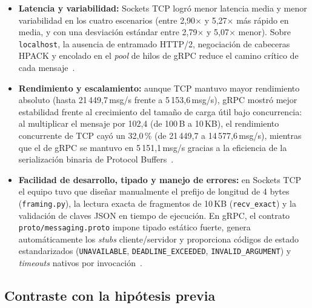 \begin{itemize}
  \item \textbf{Latencia y variabilidad:} Sockets TCP logró menor latencia media y menor variabilidad en los cuatro escenarios (entre 2,90$\times$ y 5,27$\times$ más rápido en media, y con una desviación estándar entre 2,79$\times$ y 5,07$\times$ menor). Sobre \texttt{localhost}, la ausencia de entramado HTTP/2, negociación de cabeceras HPACK y encolado en el \emph{pool} de hilos de gRPC reduce el camino crítico de cada mensaje~\cite{liu2022session,ciftci2025review}.
  \item \textbf{Rendimiento y escalamiento:} aunque TCP mantuvo mayor rendimiento absoluto (hasta 21\,449,7\,msg/s frente a 5\,153,6\,msg/s), gRPC mostró mejor estabilidad frente al crecimiento del tamaño de carga útil bajo concurrencia: al multiplicar el mensaje por 102,4 (de 100\,B a 10\,KB), el rendimiento concurrente de TCP cayó un 32,0\,\% (de 21\,449,7 a 14\,577,6\,msg/s), mientras que el de gRPC se mantuvo en 5\,151,1\,msg/s gracias a la eficiencia de la serialización binaria de Protocol Buffers~\cite{jackson2024streaming,mehdi2026crosslanguage}.
  \item \textbf{Facilidad de desarrollo, tipado y manejo de errores:} en Sockets TCP el equipo tuvo que diseñar manualmente el prefijo de longitud de 4 bytes (\texttt{framing.py}), la lectura exacta de fragmentos de 10\,KB (\texttt{recv\_exact}) y la validación de claves JSON en tiempo de ejecución. En gRPC, el contrato \texttt{proto/messaging.proto} impone tipado estático fuerte, genera automáticamente los \emph{stubs} cliente/servidor y proporciona códigos de estado estandarizados (\texttt{UNAVAILABLE}, \texttt{DEADLINE\_EXCEEDED}, \texttt{INVALID\_ARGUMENT}) y \emph{timeouts} nativos por invocación~\cite{niswar2024performance,zhu2025rethinking}.
\end{itemize}

\subsection{Contraste con la hipótesis previa}

